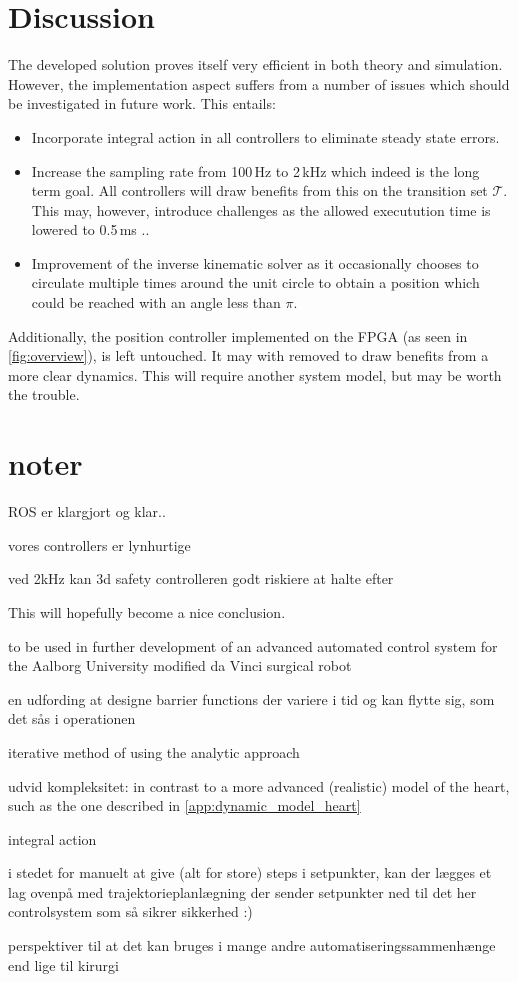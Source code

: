\section*{Discussion}
The developed solution proves itself very efficient in both theory and simulation. However, the implementation aspect suffers from a number of issues which should be investigated in future work. This entails:
\begin{itemize}
\item Incorporate integral action in all controllers to eliminate steady state errors.
\item Increase the sampling rate from 100\,Hz to 2\,kHz which indeed is the long term goal. All controllers will draw benefits from this on the transition set $\mathcal{T}$. This may, however, introduce challenges as the allowed executution time is lowered to 0.5\,ms .. 
\item Improvement of the inverse kinematic solver as it occasionally chooses to circulate multiple times around the unit circle to obtain a position which could be reached with an angle less than $\pi$.
\end{itemize}
Additionally, the position controller implemented on the FPGA (as seen in \autoref{fig:overview}), is left untouched. It may with removed to draw benefits from a more clear dynamics. This will require another system model, but may be worth the trouble.

\section*{noter}
ROS er klargjort og klar..

vores controllers er lynhurtige

ved 2kHz kan 3d safety controlleren godt riskiere at halte efter

This will hopefully become a nice conclusion.

to be used in further development of an advanced automated control system for the Aalborg University modified da Vinci surgical robot

en udfording at designe barrier functions der variere i tid og kan flytte sig, som det sås i operationen

iterative method of using the analytic approach

udvid kompleksitet:
in contrast to a more advanced (realistic) model of the heart, such as the one described in \autoref{app:dynamic_model_heart}

integral action

i stedet for manuelt at give (alt for store) steps i setpunkter, kan der lægges et lag ovenpå med trajektorieplanlægning der sender setpunkter ned til det her controlsystem som så sikrer sikkerhed :)

perspektiver til at det kan bruges i mange andre automatiseringssammenhænge end lige til kirurgi